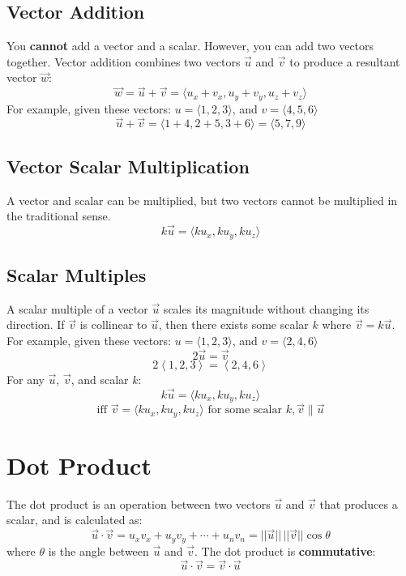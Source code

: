 \documentclass[a4paper,12pt,openany]{book}
\newcommand{\vcomponents}[4]{
    #1 = \langle #2, #3, #4 \rangle
}
\begin{document}
\subsection{Vector Addition}
You \textbf{cannot} add a vector and a scalar. However, you can add two vectors together. Vector addition combines two vectors \(\vec{u}\) and \(\vec{v}\) to produce a resultant vector \(\vec{w}\):
\[
    \vec{w} = \vec{u} + \vec{v} = \langle u_x + v_x, u_y + v_y, u_z + v_z \rangle
\]
For example, given these vectors: $\vcomponents{u}{1}{2}{3}$, and $\vcomponents{v}{4}{5}{6}$
\[
\vec{u} + \vec{v} = \langle 1 + 4, 2 + 5, 3 + 6 \rangle = \langle 5, 7, 9 \rangle
\]

\subsection{Vector Scalar Multiplication}
A vector and scalar can be multiplied, but two vectors cannot be multiplied in the traditional sense.
\[
    k\vec{u} = \langle ku_x, ku_y, ku_z \rangle
\]


\subsection{Scalar Multiples}
A scalar multiple of a vector \(\vec{u}\) scales its magnitude without changing its direction. If \(\vec{v}\) is collinear to \(\vec{u}\), then there exists some scalar $k$ where \(\vec{v} = k\vec{u}\).
For example, given these vectors: $\vcomponents{u}{1}{2}{3}$, and $\vcomponents{v}{2}{4}{6}$
\[
2\vec{u} = \vec{v}
\]
\[
2\left\langle 1, 2, 3\right\rangle = 
\left\langle 2, 4, 6\right\rangle
\]
For any \(\vec{u}\), \(\vec{v}\), and scalar \(k\):
\[
k\vec{u} = \langle ku_x, ku_y, ku_z \rangle
\]
\[
    \text{iff } \vec{v} = \langle ku_x, ku_y, ku_z \rangle \text{ for some scalar } k, \vec{v} \parallel \vec{u}
\]


\section{Dot Product}
The dot product is an operation between two vectors \(\vec{u}\) and \(\vec{v}\) that produces a scalar, and is calculated as:
\[
    \vec{u} \cdot \vec{v} = u_x v_x + u_y v_y + \cdots + u_n v_n = ||\vec{u}|| \, ||\vec{v}|| \cos{\theta}
\]
where \(\theta\) is the angle between \(\vec{u}\) and \(\vec{v}\). The dot product is \textbf{commutative}:
\[
    \vec{u} \cdot \vec{v} = \vec{v} \cdot \vec{u}
\] 
\end{document}

